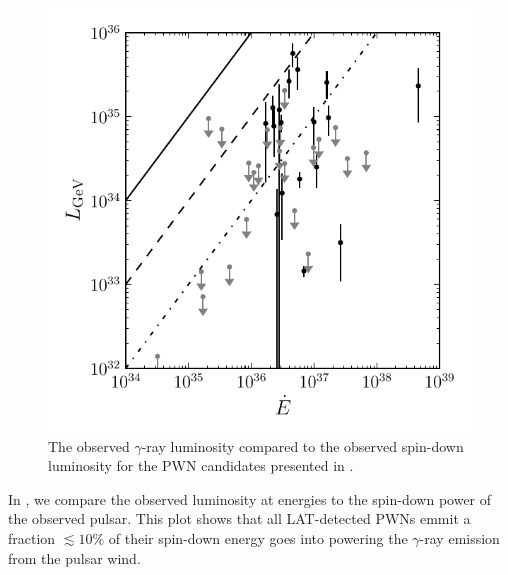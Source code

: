 \begin{figure}[htbp]
  \centering
  \includegraphics{chapters/population_study/figures/pwn_luminosity_vs_edot.pdf}
  \caption{The observed $\gamma$-ray luminosity compared to the observed
  spin-down luminosity for the \ac{PWN} candidates presented in
  .}
\end{figure}

In , we compare the observed luminosity at
\gev energies to the spin-down power of the observed pulsar.  This plot
shows that all \ac{LAT}-detected \acp{PWN} emmit a fraction $\lesssim
10\%$ of their spin-down energy goes into powering the $\gamma$-ray
emission from the pulsar wind.


